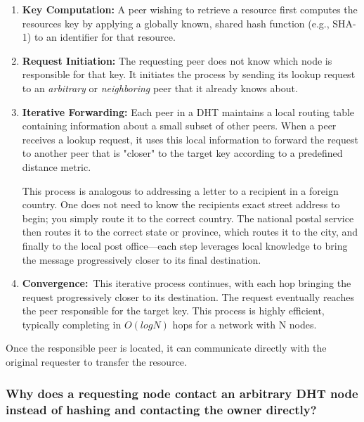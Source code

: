 \documentclass{scrbook}
\begin{document}
\begin{enumerate}
    \item
    \textbf{Key Computation:} A peer wishing to retrieve a resource first computes the resource\textquotesingle s key by applying a globally
    known, shared hash function (e.g., SHA-1) to an identifier for that
    resource.

    \item 
    \textbf{Request Initiation:} The requesting peer does not know which node is responsible for that key. It initiates the process by sending its lookup request to an \emph{arbitrary} or \emph{neighboring} peer
    that it already knows about.

    \item 
    \textbf{Iterative Forwarding:} Each peer in a DHT maintains a local routing table containing information about a small subset of other peers. When a peer receives a lookup request, it uses this local information to forward the request to another peer that is "closer" to the target key according to a predefined distance metric.
    
    This process is analogous to addressing a letter to a recipient in a foreign country. One does not need to know the recipient\textquotesingle s exact street address to begin; you simply
    route it to the correct country. The national postal service then routes
    it to the correct state or province, which routes it to the city, and
    finally to the local post office---each step leverages local knowledge
    to bring the message progressively closer to its final destination.

    \item 
    \textbf{Convergence:}~This iterative process continues, with each hop bringing the request progressively closer to its destination. The
    request eventually reaches the peer responsible for the target key. This
    process is highly efficient, typically completing in $O(log N)$ hops for a network with N nodes.
\end{enumerate}

Once the responsible peer is located, it can communicate directly with
the original requester to transfer the resource.

\subsubsection{Why does a requesting node contact an arbitrary DHT node instead of hashing and contacting the owner directly?}
\end{document}
